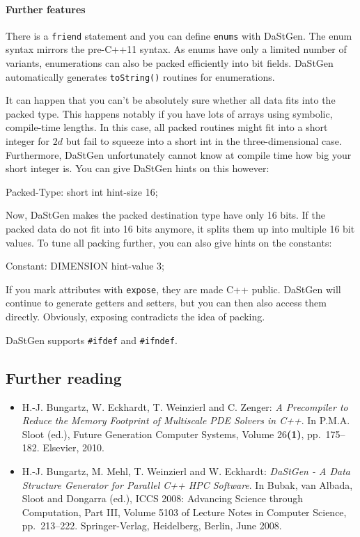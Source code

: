 \paragraph{Further features}

There is a \texttt{friend} statement and you can define \texttt{enums} with
DaStGen. 
The enum syntax mirrors the pre-C++11 syntax.
As enums have only a limited number of variants, enumerations can also be packed
efficiently into bit fields.
DaStGen automatically generates \texttt{toString()} routines for enumerations.


It can happen that you can't be absolutely sure whether all data fits into the
packed type.
This happens notably if you have lots of arrays using symbolic, compile-time
lengths.
In this case, all packed routines might fit into a short integer for $2d$ but
fail to squeeze into a short int in the three-dimensional case. 
Furthermore, DaStGen unfortunately cannot know at compile time how big your
short integer is.
You can give DaStGen hints on this however:
\begin{code}
  Packed-Type: short int hint-size 16;
\end{code} 

\noindent
Now, DaStGen makes the packed destination type have only 16 bits. If the packed
data do not fit into 16 bits anymore, it splits them up into multiple 16 bit
values.
To tune all packing further, you can also give hints on the constants:
\begin{code}
 Constant: DIMENSION hint-value 3;
\end{code} 


If you mark attributes with \texttt{expose}, they are made C++ public.
DaStGen will continue to generate getters and setters, but you can then also
access them directly.
Obviously, exposing contradicts the idea of packing.


DaStGen supports \texttt{\#ifdef} and \texttt{\#ifndef}. 



\subsection*{Further reading}

\begin{itemize}
  \item H.-J. Bungartz, W. Eckhardt, T. Weinzierl and C. Zenger: {\em A Precompiler to
Reduce the Memory Footprint of Multiscale PDE Solvers in C++}.
In P.M.A. Sloot (ed.), Future Generation Computer Systems, Volume 26{\bf (1)},
pp.~175--182. Elsevier, 2010.
  \item H.-J. Bungartz, M. Mehl, T. Weinzierl and W. Eckhardt: {\em DaStGen - A Data
Structure Generator for Parallel C++ HPC Software}.
In Bubak, van Albada, Sloot and Dongarra (ed.), ICCS 2008: Advancing Science
through Computation, Part III, Volume 5103 of Lecture Notes in Computer Science,
pp.~213--222. Springer-Verlag, Heidelberg, Berlin, June 2008.
\end{itemize}
